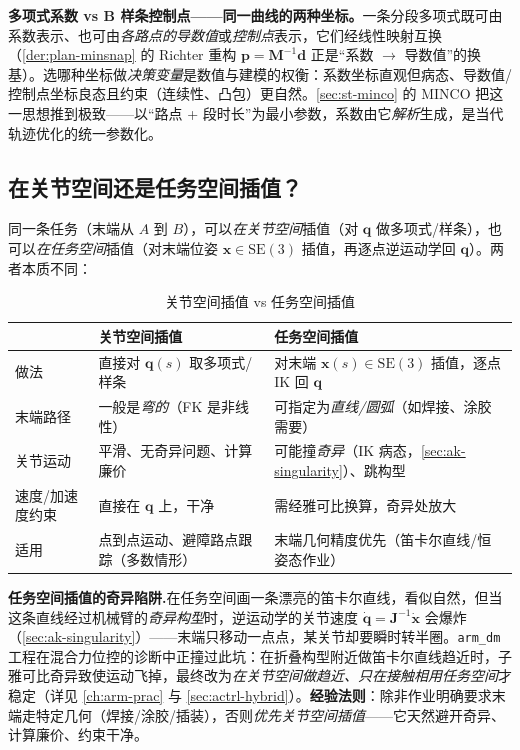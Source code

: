 \begin{insight}
\textbf{多项式系数 vs B 样条控制点——同一曲线的两种坐标。}\;一条分段多项式既可由系数表示、也可由\emph{各路点的导数值}或\emph{控制点}表示，它们经线性映射互换（\cref{der:plan-minsnap} 的 Richter 重构 $\mathbf{p}=\mathbf{M}^{-1}\mathbf{d}$ 正是“系数 $\to$ 导数值”的换基）。选哪种坐标做\emph{决策变量}是数值与建模的权衡：系数坐标直观但病态、导数值/控制点坐标良态且约束（连续性、凸包）更自然。\cref{sec:st-minco} 的 MINCO 把这一思想推到极致——以“路点 + 段时长”为最小参数，系数由它\emph{解析}生成，是当代轨迹优化的统一参数化。
\end{insight}

\subsection{在关节空间还是任务空间插值？}
\label{subsec:at-jointvstask}

同一条任务（末端从 $A$ 到 $B$），可以\emph{在关节空间}插值（对 $\mathbf{q}$ 做多项式/样条），也可以\emph{在任务空间}插值（对末端位姿 $\mathbf{x}\in\mathrm{SE}(3)$ 插值，再逐点逆运动学回 $\mathbf{q}$）。两者本质不同：

\begin{table}[H]\centering\small
\caption{关节空间插值 vs 任务空间插值}
\label{tab:at-jointvstask}
\begin{tabular}{p{} p{} p{}}
\toprule
& 关节空间插值 & 任务空间插值 \\
\midrule
做法 & 直接对 $\mathbf{q}(s)$ 取多项式/样条 & 对末端 $\mathbf{x}(s)\in\mathrm{SE}(3)$ 插值，逐点 IK 回 $\mathbf{q}$ \\
末端路径 & 一般是\emph{弯的}（FK 是非线性） & 可指定为\emph{直线/圆弧}（如焊接、涂胶需要） \\
关节运动 & 平滑、无奇异问题、计算廉价 & 可能撞\emph{奇异}（IK 病态，\cref{sec:ak-singularity}）、跳构型 \\
速度/加速度约束 & 直接在 $\mathbf{q}$ 上，干净 & 需经雅可比换算，奇异处放大 \\
适用 & 点到点运动、避障路点跟踪（多数情形） & 末端几何精度优先（笛卡尔直线/恒姿态作业） \\
\bottomrule
\end{tabular}
\end{table}

\begin{pitfall}
\textbf{任务空间插值的奇异陷阱.}\;在任务空间画一条漂亮的笛卡尔直线，看似自然，但当这条直线经过机械臂的\emph{奇异构型}时，逆运动学的关节速度 $\dot{\mathbf{q}}=\mathbf{J}^{-1}\dot{\mathbf{x}}$ 会爆炸（\cref{sec:ak-singularity}）——末端只移动一点点，某关节却要瞬时转半圈。\texttt{arm\_dm} 工程在混合力位控的诊断中正撞过此坑：在折叠构型附近做笛卡尔直线趋近时，子雅可比奇异致使运动飞掉，最终改为\emph{在关节空间做趋近、只在接触相用任务空间}才稳定（详见 \cref{ch:arm-prac} 与 \cref{sec:actrl-hybrid}）。\textbf{经验法则}：除非作业明确要求末端走特定几何（焊接/涂胶/插装），否则\emph{优先关节空间插值}——它天然避开奇异、计算廉价、约束干净。
\end{pitfall}

